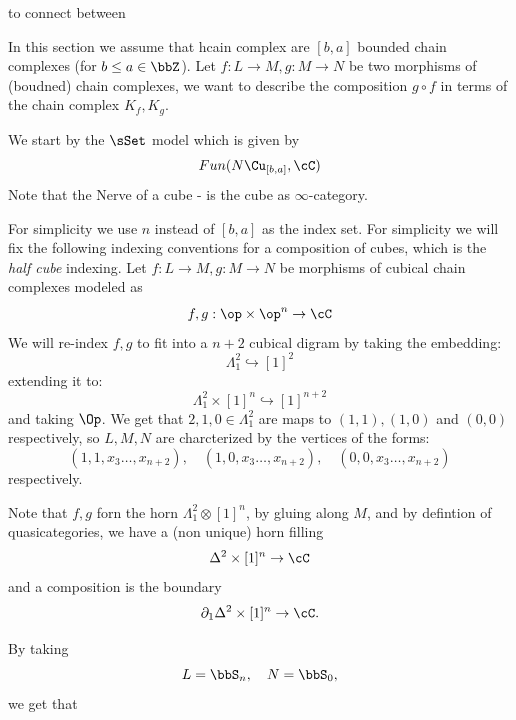 to connect between 



In this section we assume that hcain complex are $[b,a]$ bounded chain complexes (for $b \leq a \in \bbZ$).
Let $f:L \to M, g:M \to N$ be two morphisms of (boudned) chain complexes, we want to describe the composition $g \circ f$ in terms of the chain complex $K_f,K_g$.

We start by the $\sSet$ model which is given by
\[
    Fun(N \Cu_{[b,a]},\cC)
\]
Note that the Nerve of a cube - is the cube as $\infty$-category.

For simplicity we use $n$ instead of $[b,a]$ as the index set.
For simplicity we will fix the following indexing conventions for a composition of cubes, which is the \emph{half cube} indexing.
Let $f: L \to M, g: M \to N$ be morphisms of cubical chain complexes modeled as  
\[
    f,g: \op \times \op^n \to \cC
\]
We will re-index $f,g$ to fit into a $n+2$ cubical digram by taking the embedding:
\[
    \Lambda^2_1 \hookrightarrow  [1]^2
\]
extending it to:
\[
    \Lambda^2_1 \times [1]^n \hookrightarrow [1]^{n+2}
\]
and taking $\Op$. We get that $2,1,0 \in \Lambda^2_1$ are maps to $(1,1),(1,0)$ and $(0,0)$ respectively, so $L,M,N$ are charcterized by the vertices of the forms:
\[
    (1,1, x_3 \dots , x_{n+2}) , \quad (1,0, x_3 \dots , x_{n+2}) , \quad (0,0, x_3 \dots , x_{n+2})
\]
respectively.

Note that $f,g$ forn the horn $\Lambda^2_1 \otimes [1]^n$, by gluing along $M$,  and by defintion of quasicategories, we have a (non unique) horn filling
\[
    \Delta^2 \times [1]^n \to \cC
\]
and a composition is the boundary
\[
    \partial_1 \Delta^2 \times [1]^n \to \cC.
\]

By taking
\[
    L = \bbS_n, \quad N = \bbS_{0},
\]
we get that 

